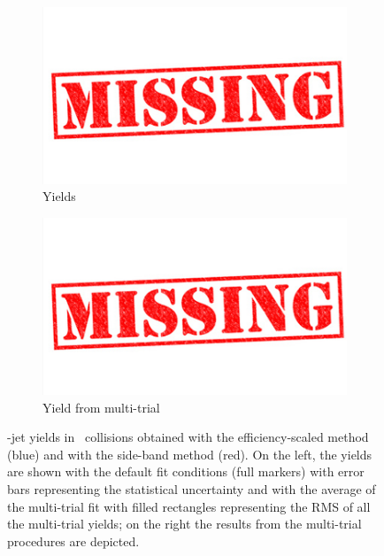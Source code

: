 \begin{figure}[bth]
\begin{center}
\begin{subfigure}[b]{.2\textwidth}
\includegraphics[width=\textwidth]{missing}
\caption{Yields}
\label{fig:AverageRawYieldVsDefault_Yields_pPb}
\end{subfigure}
\begin{subfigure}[b]{.2\textwidth}
\includegraphics[width=\textwidth]{missing}
\caption{Yield from multi-trial}
\label{fig:MultiTrialSys_pPb}
\end{subfigure}
\caption{\Dstar-jet yields in \pPb\ collisions obtained with the efficiency-scaled method (blue) and with the side-band method (red).
On the left, the yields are shown with the default fit conditions (full markers) with error bars representing the statistical uncertainty and with the average of
the multi-trial fit with filled rectangles representing the RMS of all the multi-trial yields; on the right the results from the multi-trial procedures are depicted.} 
\label{fig:AverageRawYieldVsDefault_pPB}
\end{center}
\end{figure}

